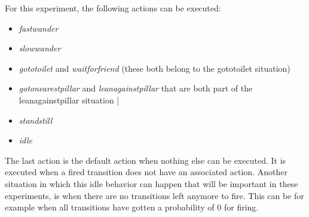 \documentclass[11pt, a4paper]{book}
\begin{document}
For this experiment, the following actions can be executed:
\begin{itemize}
\item \emph{fastwander}
\item \emph{slowwander}
\item \emph{gototoilet} and \emph{waitforfriend} (these both belong to the gototoilet situation)
\item \emph{gotonearestpillar} and \emph{leanagainstpillar} that are both part of the leanagainstpillar situation |
\item \emph{standstill}
\item \emph{idle}
\end{itemize}
The last action is the default action when nothing else can be executed. It is executed when a fired transition does not have an associated action. Another situation in which this idle behavior can happen that will be important in these experiments, is when there are no transitions left anymore to fire. This can be for example when all transitions have gotten a probability of 0 for firing.

\end{document}
